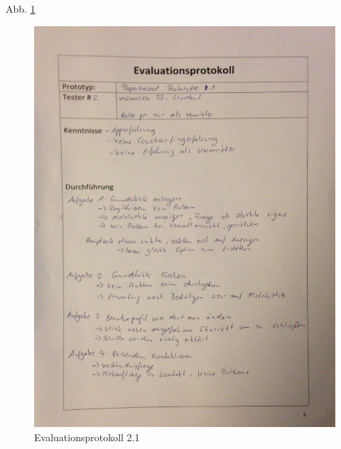 Abb. \ref{fig:evaluation21}
\begin{figure}[H]
\includegraphics[width=1\textwidth]{./images/evaluation/eva21.JPG}
\caption{Evaluationsprotokoll 2.1}
\label{fig:evaluation21}
\end{figure}

